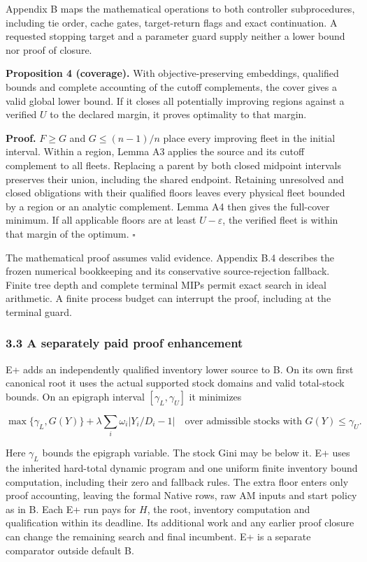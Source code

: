 \documentclass[
  american,
  11pt,
]{article}
\begin{document}
Appendix B maps the mathematical operations to both controller
subprocedures, including tie order, cache gates, target-return flags and
exact continuation. A requested stopping target and a parameter guard
supply neither a lower bound nor proof of closure.


\textbf{Proposition 4 (coverage).} With objective-preserving embeddings,
qualified bounds and complete accounting of the cutoff complements, the
cover gives a valid global lower bound. If it closes all potentially
improving regions against a verified \(U\) to the declared margin, it
proves optimality to that margin.

\textbf{Proof.} \(F\ge G\) and \(G\le(n-1)/n\) place every improving
fleet in the initial interval. Within a region, Lemma A3 applies the
source and its cutoff complement to all fleets. Replacing a parent by
both closed midpoint intervals preserves their union, including the
shared endpoint. Retaining unresolved and closed obligations with their
qualified floors leaves every physical fleet bounded by a region or an
analytic complement. Lemma A4 then gives the full-cover minimum. If all
applicable floors are at least \(U-\varepsilon\), the verified fleet is
within that margin of the optimum. \(\square\)

The mathematical proof assumes valid evidence. Appendix B.4 describes
the frozen numerical bookkeeping and its conservative source-rejection
fallback. Finite tree depth and complete terminal MIPs permit exact
search in ideal arithmetic. A finite process budget can interrupt the
proof, including at the terminal guard.

\subsubsection{3.3 A separately paid proof
enhancement}\label{a-separately-paid-proof-enhancement}

E+ adds an independently qualified inventory lower source to B. On its
own first canonical root it uses the actual supported stock domains and
valid total-stock bounds. On an epigraph interval
\([\gamma_L,\gamma_U]\) it minimizes

\[
\max\{\gamma_L,G(Y)\}+\lambda\sum_i\omega_i|Y_i/D_i-1|
\quad\text{over admissible stocks with }G(Y)\le\gamma_U.
\]

Here \(\gamma_L\) bounds the epigraph variable. The stock Gini may be
below it. E+ uses the inherited hard-total dynamic program and one
uniform finite inventory bound computation, including their zero and
fallback rules. The extra floor enters only proof accounting, leaving
the formal Native rows, raw AM inputs and start policy as in B. Each E+
run pays for \(H\), the root, inventory computation and qualification
within its deadline. Its additional work and any earlier proof closure
can change the remaining search and final incumbent. E+ is a separate
comparator outside default B.
\end{document}
